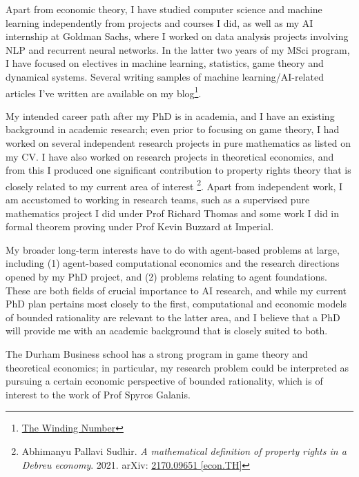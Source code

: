 \documentclass{article}
\begin{document}
\par\medskip

Apart from economic theory, I have studied computer science and machine learning independently from projects and courses I did, as well as my AI internship at Goldman Sachs, where I worked on data analysis projects involving NLP and recurrent neural networks. In the latter two years of my MSci program, I have focused on electives in machine learning, statistics, game theory and dynamical systems. Several writing samples of machine learning/AI-related articles I've written are available on my blog\footnote{\href{https://thewindingnumber.blogspot.com}{The Winding Number}}. 

\par\medskip

My intended career path after my PhD is in academia, and I have an existing background in academic research; even prior to focusing on game theory, I had worked on several independent research projects in pure mathematics as listed on my CV. I have also worked on research projects in theoretical economics, and from this I produced one significant contribution to property rights theory that is closely related to my current area of interest \footnote{Abhimanyu Pallavi Sudhir.
\emph{A mathematical definition of property rights in a Debreu economy}. 2021. arXiv:
\href{https://arxiv.org/abs/2107.09651}{2170.09651 [econ.TH]}}. Apart from independent work, I am accustomed to working in research teams, such as a supervised pure mathematics project I did under Prof Richard Thomas and some work I did in formal theorem proving under Prof Kevin Buzzard at Imperial.

\par\medskip

My broader long-term interests have to do with agent-based problems at large, including (1) agent-based computational economics and the research directions opened by my PhD project, and (2) problems relating to agent foundations. These are both fields of crucial importance to AI research, and while my current PhD plan pertains most closely to the first, computational and economic models of bounded rationality are relevant to the latter area, and I believe that a PhD will provide me with an academic background that is closely suited to both.

\par\medskip

The Durham Business school has a strong program in game theory and theoretical economics; in particular, my research problem could be interpreted as pursuing a certain economic perspective of bounded rationality, which is of interest to the work of Prof Spyros Galanis.
\end{document}
